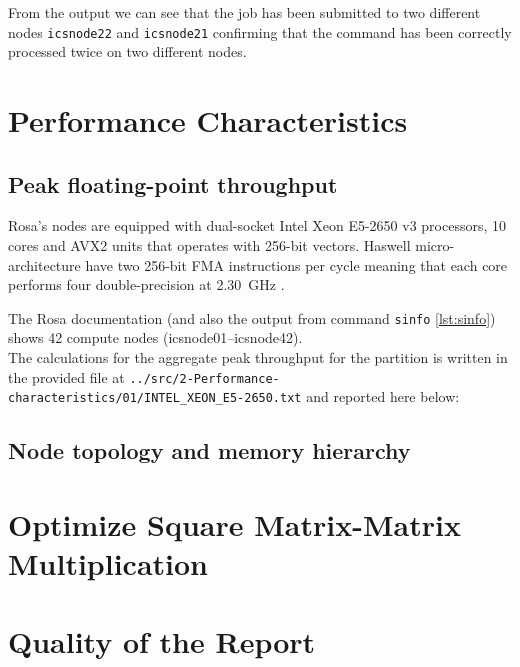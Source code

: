 \documentclass[unicode,11pt,a4paper,oneside,numbers=endperiod,openany]{scrartcl}
\begin{document}


From the output we can see that the job has been submitted to two different nodes \texttt{icsnode22} and \texttt{icsnode21} confirming that the command has been correctly processed twice on two different nodes.


\section{Performance Characteristics }

\subsection{Peak floating-point throughput}
\label{subsec:peak_fp}
Rosa's nodes are equipped with dual-socket Intel Xeon E5-2650 v3 processors, 10 cores and AVX2 units that operates with 256-bit vectors\cite{intel-e5-2650v3,usi-rosa-hardware}. Haswell micro-architecture have two 256-bit FMA instructions per cycle meaning that each core performs four double-precision at 2.30~GHz \cite{intel-optimization-manual}.

The Rosa documentation (and also the output from command \texttt{sinfo} \ref{lst:sinfo}) shows 42 compute nodes (icsnode01--icsnode42).\cite{usi-rosa-hardware} \\ 
The calculations for the aggregate peak throughput for the partition is written in the provided file at \texttt{../src/2-Performance-characteristics/01/INTEL\_XEON\_E5-2650.txt}
and reported here below:




\subsection{Node topology and memory hierarchy}



\section{Optimize Square Matrix-Matrix Multiplication  }


\section{Quality of the Report  }



\end{document}
